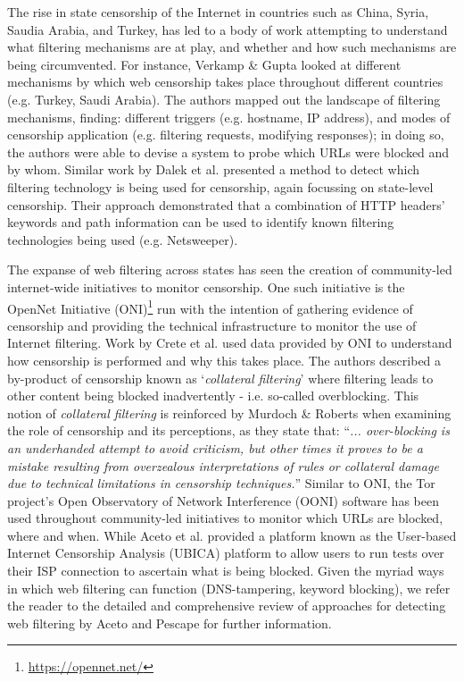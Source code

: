\documentclass{bmcart}
\begin{document}
The rise in state censorship of the Internet in countries such as China, Syria, Saudia Arabia, and Turkey, has led to a body of work attempting to understand what filtering mechanisms are at play, and whether and how such mechanisms are being circumvented.
For instance, Verkamp \& Gupta \cite{verkamp2012inferring} looked at different mechanisms by which web censorship takes place throughout different countries (e.g. Turkey, Saudi Arabia).
The authors mapped out the landscape of filtering mechanisms, finding: different triggers (e.g. hostname, IP address), and modes of censorship application (e.g. filtering requests, modifying responses); in doing so, the authors were able to devise a system to probe which URLs were blocked and by whom.
Similar work by Dalek et al. \cite{dalek2013method} presented a method to detect which filtering technology is being used for censorship, again focussing on state-level censorship.
Their approach demonstrated that a combination of HTTP headers' keywords and path information can be used to identify known filtering technologies being used (e.g. Netsweeper).

The expanse of web filtering across states has seen the creation of community-led internet-wide initiatives to monitor censorship.
One such initiative is the OpenNet Initiative (ONI)\footnote{\url{https://opennet.net/}} run with the intention of gathering evidence of censorship and providing the technical infrastructure to monitor the use of Internet filtering.
Work by Crete et al. \cite{crete2013not} used data provided by ONI to understand how censorship is performed and why this takes place.
The authors described a by-product of censorship known as `\textit{collateral filtering}' where filtering leads to other content being blocked inadvertently - i.e. so-called overblocking.
This notion of \textit{collateral filtering} is reinforced by Murdoch \& Roberts \cite{murdoch2013internet} when examining the role of censorship and its perceptions, as they state that: ``\textit{... over-blocking is an underhanded attempt to avoid criticism, but other times it proves to be a mistake resulting from overzealous interpretations of rules or collateral damage due to technical limitations in censorship techniques.}''
Similar to ONI, the Tor project's Open Observatory of Network Interference (OONI) software \cite{ooni2015} has been used throughout community-led initiatives to monitor which URLs are blocked, where and when.
While Aceto et al. \cite{aceto2015monitoring} provided a platform known as the User-based Internet Censorship Analysis (UBICA) platform to allow users to run tests over their ISP connection to ascertain what is being blocked.
Given the myriad ways in which web filtering can function (DNS-tampering, keyword blocking), we refer the reader to the detailed and comprehensive review of approaches for detecting web filtering by Aceto and Pescape \cite{aceto2015internet} for further information.
\end{document}
